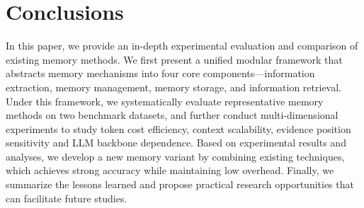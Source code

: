 \section{Conclusions}
\label{sec:conclusions}

In this paper, we provide an in-depth experimental evaluation and comparison of existing memory methods. We first present a unified modular framework that abstracts memory mechanisms into four core components—information extraction, memory management, memory storage, and information retrieval. Under this framework, we systematically evaluate representative memory methods on two benchmark datasets, and further conduct multi-dimensional experiments to study token cost efficiency, context scalability, evidence position sensitivity and LLM backbone dependence. Based on experimental results and analyses, we develop a new memory variant by combining existing techniques, which achieves strong accuracy while maintaining low overhead. Finally, we summarize the lessons learned and propose practical research opportunities that can facilitate future studies.